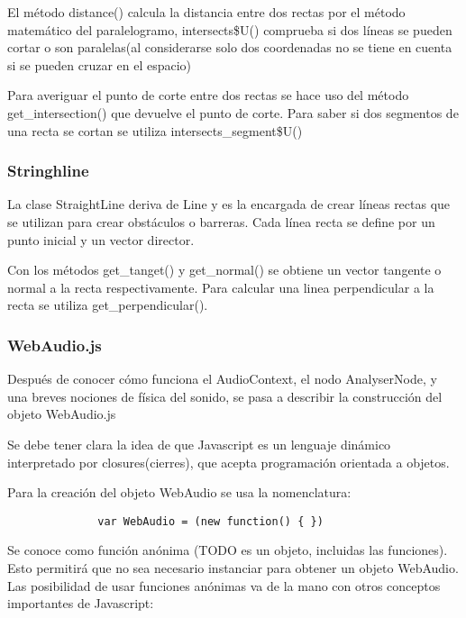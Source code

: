 El método distance() calcula la distancia entre dos rectas por el método matemático del paralelogramo, intersects\$U() comprueba si dos líneas se pueden cortar o son paralelas(al considerarse solo dos coordenadas no se tiene en cuenta si se pueden cruzar en el espacio)

Para averiguar el punto de corte entre dos rectas se hace uso del método get\_intersection() que devuelve el punto de corte. Para saber si dos segmentos de una recta se cortan se utiliza intersects\_segment\$U()

\subsubsection{Stringhline}
\label{sec:stringhline}
La clase StraightLine deriva de Line y es la encargada de crear  líneas rectas que se utilizan para crear obstáculos o barreras. Cada línea recta se define por un punto inicial y un vector director. 

Con los métodos get\_tanget() y get\_normal() se obtiene un vector tangente o normal a la recta respectivamente. Para calcular una linea perpendicular a la recta se utiliza get\_perpendicular().

\subsubsection{WebAudio.js}
\label{sec:webaudio}
Después de conocer cómo funciona el AudioContext, el nodo AnalyserNode, y una breves nociones de física del sonido, se pasa a describir la construcción del objeto WebAudio.js


Se debe tener clara la idea de que Javascript es un lenguaje dinámico interpretado por closures(cierres), que acepta programación orientada a objetos.

Para la creación del objeto WebAudio se usa la nomenclatura:

\begin{verbatim}
              var WebAudio = (new function() { })
\end{verbatim}

Se conoce como función anónima (TODO es un objeto, incluidas las funciones). Esto permitirá que no sea necesario instanciar para obtener un objeto WebAudio. 
Las posibilidad de usar funciones anónimas va de la mano con otros conceptos importantes de Javascript:

